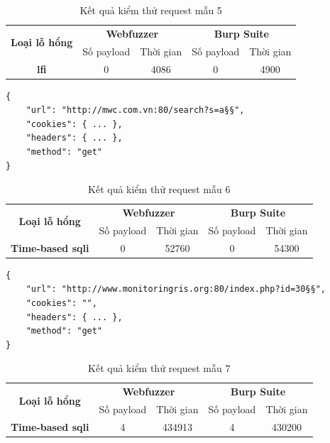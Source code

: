 \FloatBarrier
\begin{table}[ht]
    \centering
    \caption{Kết quả kiểm thử request mẫu 5}
    \label{tab:testing-result-5}
    \begin{tabular}[ht]{ccccc}
        \toprule[1pt]\midrule[0.3pt]
            \multirow{2}{*}{\textbf{Loại lỗ hổng}}&\multicolumn{2}{c}{\textbf{Webfuzzer}}&\multicolumn{2}{c}{\textbf{Burp Suite}}\\
            \cmidrule(lr){2-3}\cmidrule(lr){4-5}{}&Số payload&Thời gian&Số payload&Thời gian\\
        \midrule[0.3pt]
            \textbf{\acrshort{lfi}}&0&4086&0&4900\\
        \midrule[0.3pt]\bottomrule[1pt]
    \end{tabular}
\end{table}
\FloatBarrier
\begin{lstlisting}[style=ES6, label={lst:base-request-6}, caption={Request mẫu 6}]
{
    "url": "http://mwc.com.vn:80/search?s=a§§",
    "cookies": { ... },
    "headers": { ... },
    "method": "get"
}
\end{lstlisting}
\FloatBarrier
\begin{table}[ht]
    \centering
    \caption{Kết quả kiểm thử request mẫu 6}
    \label{tab:testing-result-6}
    \begin{tabular}[ht]{ccccc}
        \toprule[1pt]\midrule[0.3pt]
            \multirow{2}{*}{\textbf{Loại lỗ hổng}}&\multicolumn{2}{c}{\textbf{Webfuzzer}}&\multicolumn{2}{c}{\textbf{Burp Suite}}\\
            \cmidrule(lr){2-3}\cmidrule(lr){4-5}{}&Số payload&Thời gian&Số payload&Thời gian\\
        \midrule[0.3pt]
            \textbf{Time-based \acrshort{sqli}}&0&52760&0&54300\\
        \midrule[0.3pt]\bottomrule[1pt]
    \end{tabular}
\end{table}
\FloatBarrier
\begin{lstlisting}[style=ES6, label={lst:base-request-7}, caption={Request mẫu 7 có lỗ hổng time-based \acrshort{sqli}}]
{
    "url": "http://www.monitoringris.org:80/index.php?id=30§§",
    "cookies": "",
    "headers": { ... },
    "method": "get"
}
\end{lstlisting}
\FloatBarrier
\begin{table}[ht]
    \centering
    \caption{Kết quả kiểm thử request mẫu 7}
    \label{tab:testing-result-7}
    \begin{tabular}[ht]{ccccc}
        \toprule[1pt]\midrule[0.3pt]
            \multirow{2}{*}{\textbf{Loại lỗ hổng}}&\multicolumn{2}{c}{\textbf{Webfuzzer}}&\multicolumn{2}{c}{\textbf{Burp Suite}}\\
            \cmidrule(lr){2-3}\cmidrule(lr){4-5}{}&Số payload&Thời gian&Số payload&Thời gian\\
        \midrule[0.3pt]
            \textbf{Time-based \acrshort{sqli}}&4&434913&4&430200\\
        \midrule[0.3pt]\bottomrule[1pt]
    \end{tabular}
\end{table}
